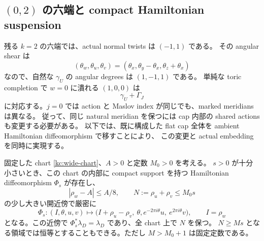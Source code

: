 \subsection{$(0,2)$ の六端と compact Hamiltonian suspension}

残る $k=2$ の六端では、actual normal twists は $(-1,1)$ である。
その angular shear は
\[
 (\theta_w,\theta_u,\theta_v)
 =(\theta_x,\theta_y-\theta_x,\theta_z+\theta_x)
\]
なので、自然な $\gamma_U$ の angular degrees は $(1,-1,1)$ である。
単純な toric completion で $w=0$ に潰れる $(1,0,0)$ は
\[
 \gamma_U+\Gamma_J
\]
に対応する。$j=0$ では action と Maslov index が同じでも、marked meridians は異なる。
従って、同じ natural meridian を保つには cap 内部の shared actions も変更する必要がある。
以下では、既に構成した flat cap 全体を ambient Hamiltonian diffeomorphism で移すことにより、
この変更と actual embedding を同時に実現する。

\begin{lemma}
\label{kc:su2-suspension}
固定した chart \eqref{kc:wide-chart}、$A>0$ と定数 $M_0>0$ を考える。
$s>0$ が十分小さいとき、この chart の内部に compact support を持つ Hamiltonian
diffeomorphism $\Phi_s$ が存在し、
\[
 |\rho_w-A|\le A/8,\qquad N:=\rho_u+\rho_v\le M_0s
\]
の少し大きい開近傍で厳密に
\begin{equation}\label{kc:strict-shear}
 \Phi_s:(I,\theta,u,v)\longmapsto
 \bigl(I+\rho_u-\rho_v,\ \theta,
       e^{-2\pi i\theta}u,\ e^{2\pi i\theta}v\bigr),
 \qquad I=\rho_w
\end{equation}
となる。この近傍で $\Phi_s^*\lambda_D=\lambda_D$ であり、全 chart 上で $N$ を保つ。
$N\ge Ms$ となる領域では恒等とすることもできる。ただし $M>M_0+1$ は固定定数である。
\end{lemma}

